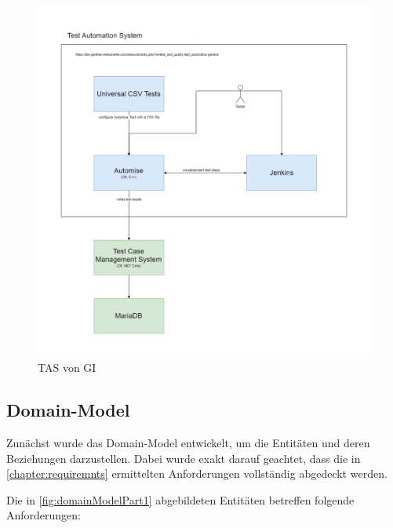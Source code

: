 \documentclass[a4paper, fontsize=11pt, parskip=half, twoside]{scrreprt}
\begin{document}
	\begin{figure}[ht]
		\centering
		\includegraphics[scale=0.3]{assets/TestTechnologiesOverview.drawio.png}
		\caption{\ac{TAS} von \ac{GI}}
		\label{fig:testAutomationSystem}
	\end{figure}
	
	\subsection{Domain-Model} \label{subsec:domainModel}
	Zunächst wurde das Domain-Model entwickelt, um die Entitäten und deren Beziehungen darzustellen.
	Dabei wurde exakt darauf geachtet, dass die in \autoref{chapter:requiremnts} ermittelten Anforderungen vollständig abgedeckt werden.

	Die in \autoref{fig:domainModelPart1} abgebildeten Entitäten betreffen folgende Anforderungen:
	
\end{document}
